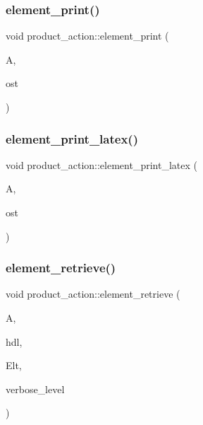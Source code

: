\mbox{\label{classproduct__action_af6ab3c458fef73b32a1467b90d1ec0bf}} 
\subsubsection{\texorpdfstring{element\+\_\+print()}{element\_print()}}
{\footnotesize\ttfamily void product\+\_\+action\+::element\+\_\+print (\begin{DoxyParamCaption}\item[{\mbox{\hyperlink{galois_8h_a09fddde158a3a20bd2dcadb609de11dc}{I\+NT}} $\ast$}]{A,  }\item[{ostream \&}]{ost }\end{DoxyParamCaption})}

\mbox{\label{classproduct__action_a0eb7bf3402a065cf45ed8fc2fa22474e}} 
\subsubsection{\texorpdfstring{element\+\_\+print\+\_\+latex()}{element\_print\_latex()}}
{\footnotesize\ttfamily void product\+\_\+action\+::element\+\_\+print\+\_\+latex (\begin{DoxyParamCaption}\item[{\mbox{\hyperlink{galois_8h_a09fddde158a3a20bd2dcadb609de11dc}{I\+NT}} $\ast$}]{A,  }\item[{ostream \&}]{ost }\end{DoxyParamCaption})}

\mbox{\label{classproduct__action_a041a4664ba3099321a2aaf0e9c70a8a2}} 
\subsubsection{\texorpdfstring{element\+\_\+retrieve()}{element\_retrieve()}}
{\footnotesize\ttfamily void product\+\_\+action\+::element\+\_\+retrieve (\begin{DoxyParamCaption}\item[{\mbox{\hyperlink{classaction}{action}} $\ast$}]{A,  }\item[{\mbox{\hyperlink{galois_8h_a09fddde158a3a20bd2dcadb609de11dc}{I\+NT}}}]{hdl,  }\item[{\mbox{\hyperlink{galois_8h_a09fddde158a3a20bd2dcadb609de11dc}{I\+NT}} $\ast$}]{Elt,  }\item[{\mbox{\hyperlink{galois_8h_a09fddde158a3a20bd2dcadb609de11dc}{I\+NT}}}]{verbose\+\_\+level }\end{DoxyParamCaption})}

